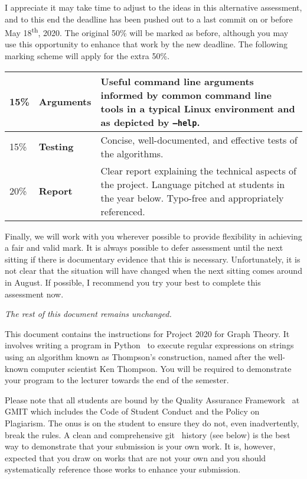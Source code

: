 \documentclass[12pt, a4paper]{article}
\newcommand{\modulename}{Graph Theory}
\newcommand{\projectyear}{2020}
\newcommand{\projectname}{Project \projectyear}
\newcommand{\duedate}{last commit on or before May 18\textsuperscript{th}, 2020}
\begin{document}
\noindent
I appreciate it may take time to adjust to the ideas in this alternative assessment, and to this end the deadline has been pushed out to a \duedate.
The original 50\% will be marked as before, although you may use this opportunity to enhance that work by the new deadline.
The following marking scheme will apply for the extra 50\%.
 

\begin{center}
  \begin{tabular}{llp{8.4cm}}
    \toprule
    15\% & \textbf{Arguments} & Useful command line arguments informed by common command line tools in a typical Linux environment and as depicted by \texttt{--help}. \\
    \midrule
    15\% & \textbf{Testing} & Concise, well-documented, and effective tests of the algorithms. \\
    \midrule
    20\% & \textbf{Report} & Clear report explaining the technical aspects of the project. Language pitched at students in the year below. Typo-free and appropriately referenced. \\
    \bottomrule
  \end{tabular}
\end{center}


Finally, we will work with you wherever possible to provide flexibility in achieving a fair and valid mark.
It is always possible to defer assessment until the next sitting if there is documentary evidence that this is necessary.
Unfortunately, it is not clear that the situation will have changed when the next sitting comes around in August.
If possible, I recommend you try your best to complete this assessment now.
\vspace{4mm}

\noindent \emph{The rest of this document remains unchanged.}

\maketitle

\noindent
This document contains the instructions for \projectname{} for \modulename{}.
It involves writing a program in Python~\cite{python} to execute regular expressions on strings using an algorithm known as Thompson's construction, named after the well-known computer scientist Ken Thompson.
You will be required to demonstrate your program to the lecturer towards the end of the semester.

Please note that all students are bound by the Quality Assurance Framework~\cite{gmitqaf} at GMIT which includes the Code of Student Conduct and the Policy on Plagiarism.
The onus is on the student to ensure they do not, even inadvertently, break the rules.
A clean and comprehensive git~\cite{git} history (see below) is the best way to demonstrate that your submission is your own work.
It is, however, expected that you draw on works that are not your own and you should systematically reference those works to enhance your submission.
\end{document}
